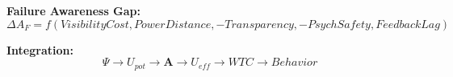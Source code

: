 \begin{tcolorbox}[colback=gray!5!white, colframe=gray!75!black, title=Chapter 11 Summary: Awareness]
\textbf{Failure Awareness Gap:}
$$\Delta A_F = f(VisibilityCost, PowerDistance, -Transparency, -PsychSafety, FeedbackLag)$$

\textbf{Integration:}
$$\Psi \rightarrow U_{pot} \rightarrow \mathbf{A} \rightarrow U_{eff} \rightarrow WTC \rightarrow Behavior$$

\end{tcolorbox}

